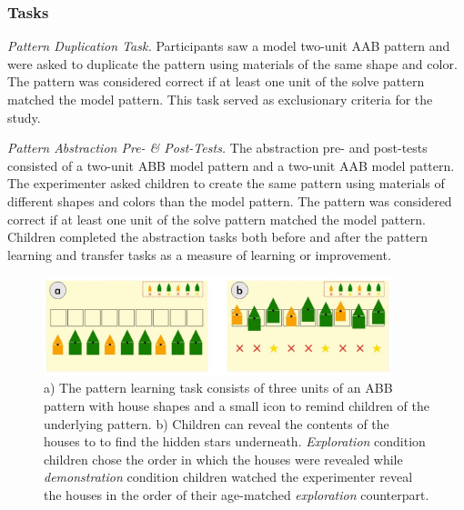 \subsubsection{Tasks}

\textit{Pattern Duplication Task.} Participants saw a model two-unit AAB pattern and were asked to duplicate the pattern using materials of the same shape and color. The pattern was considered correct if at least one unit of the solve pattern matched the model pattern. This task served as exclusionary criteria for the study. 

\textit{Pattern Abstraction Pre- \& Post-Tests.} The abstraction pre- and post-tests consisted of a two-unit ABB model pattern and a two-unit AAB model pattern. The experimenter asked children to create the same pattern using materials of different shapes and colors than the model pattern. The pattern was considered correct if at least one unit of the solve pattern matched the model pattern. Children completed the abstraction tasks both before and after the pattern learning and transfer tasks as a measure of learning or improvement.

\begin{figure}
\centering
  \includegraphics[width=0.9\textwidth]{future/figures/pattern_learn.jpg}
  \caption[The pattern learning task consists of three units of an ABB pattern with house shapes and a small icon to remind children of the underlying pattern.]{a) The pattern learning task consists of three units of an ABB pattern with house shapes and a small icon to remind children of the underlying pattern. b) Children can reveal the contents of the houses to to find the hidden stars underneath. \textit{Exploration} condition children chose the order in which the houses were revealed while \textit{demonstration} condition children watched the experimenter reveal the houses in the order of their age-matched \textit{exploration} counterpart.
}
  \label{fig:pattern-learn}
\end{figure}

